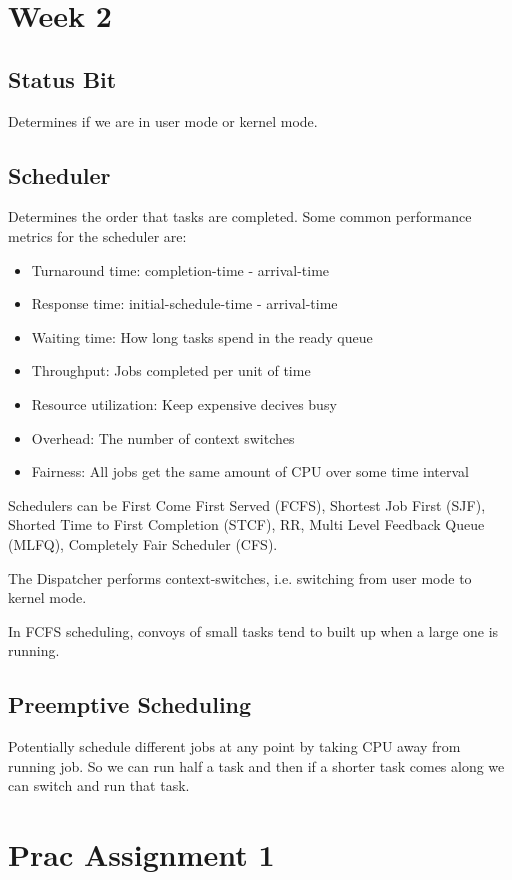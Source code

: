 \documentclass[12pt, letterpaper]{article}
\begin{document}
\section*{Week 2}
\subsection*{Status Bit}
Determines if we are in user mode or kernel mode. 

\subsection*{Scheduler}
Determines the order that tasks 
are completed. Some common performance 
metrics for the scheduler are:
\begin{itemize}
    \item Turnaround time: completion-time - arrival-time
    \item Response time: initial-schedule-time - arrival-time 
    \item Waiting time: How long tasks spend in the ready queue 
    \item Throughput: Jobs completed per unit of time 
    \item Resource utilization: Keep expensive decives busy 
    \item Overhead: The number of context switches 
    \item Fairness: All jobs get the same amount of CPU over some time interval 
\end{itemize}

Schedulers can be First Come First Served (FCFS), 
Shortest Job First (SJF), Shorted Time to First Completion 
(STCF), RR, Multi Level Feedback Queue (MLFQ),
Completely Fair Scheduler (CFS).

The Dispatcher performs context-switches, i.e. switching from 
user mode to kernel mode. 

In FCFS scheduling, convoys of small tasks tend to built 
up when a large one is running. 

\subsection*{Preemptive Scheduling}
Potentially schedule different jobs at any point 
by taking CPU away from running job. 
So we can run half a task and then if a shorter task comes 
along we can switch and run that task. 

\section*{Prac Assignment 1}
\end{document}
